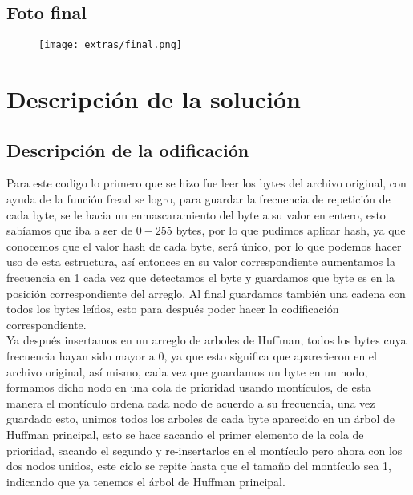 \documentclass[12 pt]{report}
\begin{document}
\subsection{Foto final}
\begin{figure}[ht]
  \centering
  \texttt{[image: extras/final.png]}
  \caption{\label{fig:Foto final} }
\end{figure}
\newpage

\section{Descripción de la solución}
\subsection{Descripción de la odificación}
Para este codigo lo primero que se hizo fue leer los bytes del archivo original, con ayuda de la función fread se logro, para guardar la frecuencia de repetición de cada byte, se le hacia un enmascaramiento del byte a su valor en entero, esto sabíamos que iba a ser de $0-255$ bytes, por lo que pudimos aplicar hash, ya que conocemos que el valor hash de cada byte, será único, por lo que podemos hacer uso de esta estructura, así entonces en su valor correspondiente aumentamos la frecuencia en 1 cada vez que detectamos el byte y guardamos que byte es en la posición correspondiente del arreglo. Al final guardamos también una cadena con todos los bytes leídos, esto para después poder hacer la codificación correspondiente.\\
Ya después insertamos en un arreglo de arboles de Huffman, todos los bytes cuya frecuencia hayan sido mayor a 0, ya que esto significa que aparecieron en el archivo original, así mismo, cada vez que guardamos un byte en un nodo, formamos dicho nodo en una cola de prioridad usando montículos, de esta manera el montículo ordena cada nodo de acuerdo a su frecuencia, una vez guardado esto, unimos todos los arboles de cada byte aparecido en un árbol de Huffman principal, esto se hace sacando el primer elemento de la cola de prioridad, sacando el segundo y re-insertarlos en el montículo pero ahora con los dos nodos unidos, este ciclo se repite hasta que el tamaño del montículo sea 1, indicando que ya tenemos el árbol de Huffman principal.\\
\end{document}
